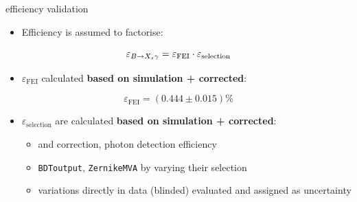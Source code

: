 \documentclass[xcolor=dvipsnames]{beamer}
\begin{document}
\begin{frame}{\BtoXsgamma efficiency validation}
\scriptsize\centering
\begin{itemize}
   \item Efficiency is assumed to factorise:
\end{itemize}
\begin{equation*}
   \varepsilon_{\BtoXsgamma} = \varepsilon_{\mathrm{FEI}} \cdot \varepsilon_{\mathrm{selection}}
\end{equation*}

\vspace{-5pt}

\begin{itemize}
   \item $\varepsilon_{\mathrm{FEI}}$ calculated \textbf{based on simulation + corrected}:
\end{itemize}
\begin{equation*}
   \varepsilon_{\mathrm{FEI}} = (0.444\pm0.015) \%
\end{equation*}

\vspace{-5pt}

\begin{itemize}
   \item $\varepsilon_{\mathrm{selection}}$ are calculated \textbf{based on simulation + corrected}:
   \begin{itemize}
      \scriptsize
      \item \piVeto and \etaVeto correction, photon detection efficiency 
      \vspace{5pt}
      \item \texttt{BDToutput}, \texttt{ZernikeMVA} by varying their selection 
      \item[\ra] variations directly in data (blinded) evaluated and assigned as uncertainty
   \end{itemize}
\end{itemize}

\end{frame}
\end{document}
